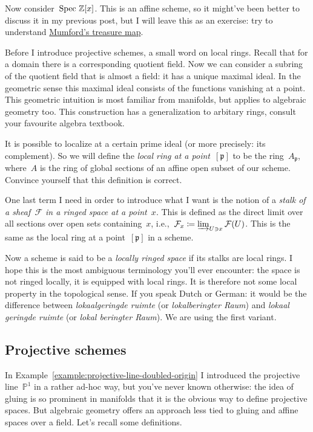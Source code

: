 \begin{example}
  Now consider~$\operatorname{Spec\,}\mathbb{Z}[x]$. This is an affine scheme, so it might've been better to discuss it in my previous post, but I will leave this as an exercise: try to understand \href{http://www.neverendingbooks.org/index.php/mumfords-treasure-map.html}{Mumford's treasure map}.
\end{example}

Before I introduce projective schemes, a small word on local rings. Recall that for a domain there is a corresponding quotient field. Now we can consider a subring of the quotient field that is almost a field: it has a unique maximal ideal. In the geometric sense this maximal ideal consists of the functions vanishing at a point. This geometric intuition is most familiar from manifolds, but applies to algebraic geometry too. This construction has a generalization to arbitary rings, consult your favourite algebra textbook.

It is possible to localize at a certain prime ideal (or more precisely: its complement). So we will define the \emph{local ring at a point~$[\mathfrak{p}]$} to be the ring~$A_{\mathfrak{p}}$, where~$A$ is the ring of global sections of an affine open subset of our scheme. Convince yourself that this definition is correct.

One last term I need in order to introduce what I want is the notion of a \emph{stalk of a sheaf~$\mathcal{F}$ in a ringed space at a point~$x$}. This is defined as the direct limit over all sections over open sets containing~$x$, i.e.,~$\mathcal{F}_x\coloneqq\varinjlim_{U\ni x}\mathcal{F}(U)$. This is the same as the local ring at a point~$[\mathfrak{p}]$ in a scheme.

Now a scheme is said to be a \emph{locally ringed space} if its stalks are local rings. I hope this is the most ambiguous terminology you'll ever encounter: the space is not ringed locally, it is equipped with local rings. It is therefore not some local property in the topological sense. If you speak Dutch or German: it would be the difference between \emph{lokaalgeringde ruimte} (or \emph{lokalberingter Raum}) and \emph{lokaal geringde ruimte} (or \emph{lokal beringter Raum}). We are using the first variant.


\subsection{Projective schemes}

In Example~\ref{example:projective-line-doubled-origin} I introduced the projective line~$\mathbb{P}^1$ in a rather ad-hoc way, but you've never known otherwise: the idea of gluing is so prominent in manifolds that it is the obvious way to define projective spaces. But algebraic geometry offers an approach less tied to gluing and affine spaces over a field. Let's recall some definitions.

